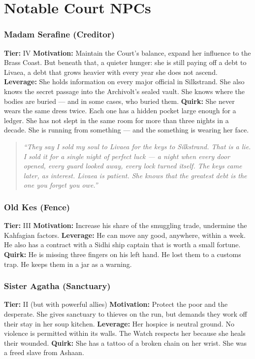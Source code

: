 \documentclass[10pt,twoside]{book}
\newenvironment{storybox}
  {\begin{quote}\itshape\small\setlength{\parskip}{0.5em}}
  {\end{quote}}
\begin{document}
\chapter{Notable Court NPCs}

\subsection{Madam Serafine (Creditor)}
\textbf{Tier:} IV
\textbf{Motivation:} Maintain the Court's balance, expand her influence to the Brass Coast. But beneath that, a quieter hunger: she is still paying off a debt to Livaea, a debt that grows heavier with every year she does not ascend.
\textbf{Leverage:} She holds information on every major official in Silkstrand. She also knows the secret passage into the Archivolt's sealed vault. She knows where the bodies are buried --- and in some cases, who buried them.
\textbf{Quirk:} She never wears the same dress twice. Each one has a hidden pocket large enough for a ledger. She has not slept in the same room for more than three nights in a decade. She is running from something --- and the something is wearing her face.

\begin{storybox}
\small
\textit{``They say I sold my soul to Livaea for the keys to Silkstrand. That is a lie. I sold it for a single night of perfect luck --- a night when every door opened, every guard looked away, every lock turned itself. The keys came later, as interest. Livaea is patient. She knows that the greatest debt is the one you forget you owe.''}
\end{storybox}

\subsection{Old Kes (Fence)}
\textbf{Tier:} III  
\textbf{Motivation:} Increase his share of the smuggling trade, undermine the Kahfagian factors.  
\textbf{Leverage:} He can move any good, anywhere, within a week. He also has a contract with a Sidhi ship captain that is worth a small fortune.  
\textbf{Quirk:} He is missing three fingers on his left hand. He lost them to a customs trap. He keeps them in a jar as a warning.

\subsection{Sister Agatha (Sanctuary)}
\textbf{Tier:} II (but with powerful allies)  
\textbf{Motivation:} Protect the poor and the desperate. She gives sanctuary to thieves on the run, but demands they work off their stay in her soup kitchen.  
\textbf{Leverage:} Her hospice is neutral ground. No violence is permitted within its walls. The Watch respects her because she heals their wounded.  
\textbf{Quirk:} She has a tattoo of a broken chain on her wrist. She was a freed slave from Ashaan.
\end{document}
